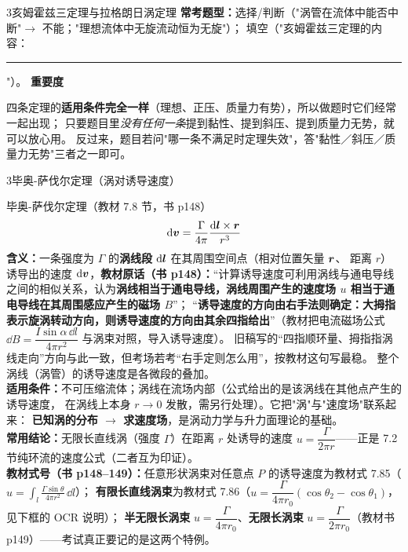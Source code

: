 \begin{kaodian}{3}{亥姆霍兹三定理与拉格朗日涡定理}
\textbf{常考题型：}选择/判断（"涡管在流体中能否中断"$\to$ 不能；"理想流体中无旋流动恒为无旋"）；
填空（"亥姆霍兹三定理的内容：\rule{2cm}{0.4pt}"）。
\textbf{重要度 }\quad{}\quad{}

\begin{tishi}
四条定理的\textbf{适用条件完全一样}（理想、正压、质量力有势），所以做题时它们经常一起出现；
只要题目里\emph{没有任何一条}提到黏性、提到斜压、提到质量力无势，就可以放心用。
反过来，题目若问"哪一条不满足时定理失效"，答"黏性／斜压／质量力无势"三者之一即可。
\end{tishi}
\end{kaodian}

\begin{kaodian}{3}{毕奥-萨伐尔定理（涡对诱导速度）}
\begin{gongshi}{毕奥-萨伐尔定理（教材 7.8 节，书 p148）}
\[ \mathrm{d}\bm{v}=\frac{\Gamma}{4\pi}\frac{\mathrm{d}\bm{l}\times\bm{r}}{r^3} \]
\textbf{含义：}一条强度为 $\Gamma$ 的\textbf{涡线段} $\mathrm{d}\bm{l}$ 在其周围空间点（相对位置矢量 $\bm{r}$、
距离 $r$）诱导出的速度 $\mathrm{d}\bm{v}$，\textbf{教材原话（书 p148）：}“计算诱导速度可利用涡线与通电导线之间的相似关系，认为\textbf{涡线相当于通电导线，涡线周围产生的速度场 $u$ 相当于通电导线在其周围感应产生的磁场 $B$}”；
“\textbf{诱导速度的方向由右手法则确定：大拇指表示旋涡转动方向，则诱导速度的方向由其余四指给出}”（教材把电流磁场公式 $\dd B=\dfrac{I\sin\alpha\,\dd l}{4\pi r^2}$ 与涡束对照，导入诱导速度）。
旧稿写的“四指顺环量、拇指指涡线走向”方向与此一致，但考场若考“右手定则怎么用”，按教材这句写最稳。
整个涡线（涡管）的诱导速度是各微段的叠加。\\
\textbf{适用条件：}不可压缩流体；涡线在流场内部（公式给出的是该涡线在其他点产生的诱导速度，
在涡线上本身 $r\to0$ 发散，需另行处理）。它把"涡"与"速度场"联系起来：
\textbf{已知涡的分布 $\to$ 求速度场}，是涡动力学与升力面理论的基础。\\
\textbf{常用结论：}无限长直线涡（强度 $\Gamma$）在距离 $r$ 处诱导的速度
$u=\dfrac{\Gamma}{2\pi r}$——正是 7.2 节纯环流的速度公式（二者互为印证）。\\
\textbf{教材式号（书 p148--149）：}任意形状涡束对任意点 $P$ 的诱导速度为教材式 7.85（$u=\displaystyle\int_l\frac{\Gamma\sin\theta}{4\pi r^2}\,\dd l$）；
\textbf{有限长直线涡束}为教材式 7.86（$u=\dfrac{\Gamma}{4\pi r_0}(\cos\theta_2-\cos\theta_1)$，见下框的 OCR 说明）；
\textbf{半无限长涡束} $u=\dfrac{\Gamma}{4\pi r_0}$、\textbf{无限长涡束} $u=\dfrac{\Gamma}{2\pi r_0}$（教材书 p149）——考试真正要记的是这两个特例。
\end{gongshi}


\end{kaodian}
